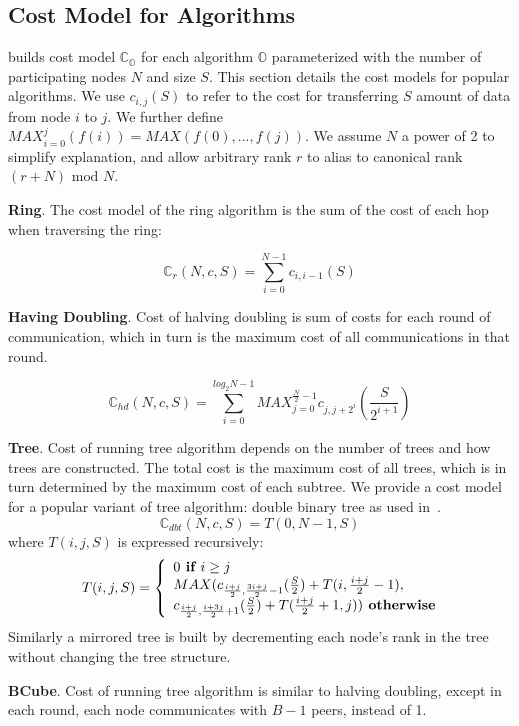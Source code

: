 \subsection{Cost Model for \collectives Algorithms}
\cmpi builds cost model $\mathbb{C}_\mathbb{O}$ for each \collectives algorithm $\mathbb{O}$ parameterized with the number of participating nodes $N$ and size $S$. This section details the cost models for popular algorithms. We use $c_{i,j}(S)$ to refer to the cost for transferring $S$ amount of data from node $i$ to $j$. We further define $MAX_{i=0}^{j}(f(i)) = MAX(f(0),...,f(j))$. We assume $N$ a power of 2 to simplify explanation, and allow arbitrary rank $r$ to alias to canonical rank $(r + N) \text{ mod } N$.
 
\noindent\textbf{Ring}. The cost model of the ring algorithm is the sum of the cost of each hop when traversing the ring: 

$$\mathbb{C}_{r}(N, c, S) = \sum_{i=0}^{N-1} c_{i,i-1}(S)$$

\noindent\textbf{Having Doubling}. Cost of halving doubling is sum of costs for each round of communication, which in turn is the maximum cost of all communications in that round. 

$$\mathbb{C}_{hd}(N, c, S) = \sum_{i=0}^{log_2N-1}MAX_{j=0}^{\frac{N}{2}-1}c_{j,j+2^i}(\frac{S}{2^{i+1}}) $$

\noindent\textbf{Tree}. Cost of running tree algorithm depends on the number of trees and how trees are constructed. The total cost is the maximum cost of all trees, which is in turn determined by the maximum cost of each subtree. We provide a cost model for a popular variant of tree algorithm: double binary tree as used in~\cite{nccl}.
$$\mathbb{C}_{dbt}(N, c, S) = T(0,N-1,S)$$
where $T(i,j,S)$ is expressed recursively: 
\begin{align*}
 T(i,j,S) = 
 \left\lbrace
\begin{array}{l@{}l}
0 \textbf{ if $i \ge j$}\\
MAX(c_{\frac{i+j}{2}, \frac{3i+j}{2}-1}(\frac{S}{2}) + T(i, \frac{i+j}{2}-1), \\
c_{\frac{i+j}{2}, \frac{i+3j}{2}+1}(\frac{S}{2}) + T(\frac{i+j}{2}+1, j)) \textbf{ otherwise}
\end{array}
\right.
\end{align*}
Similarly a mirrored tree is built by decrementing each node's rank in the tree without changing the tree structure.

\noindent\textbf{BCube}. Cost of running tree algorithm is similar to halving doubling, except in each round, each node communicates with $B-1$ peers, instead of 1.

